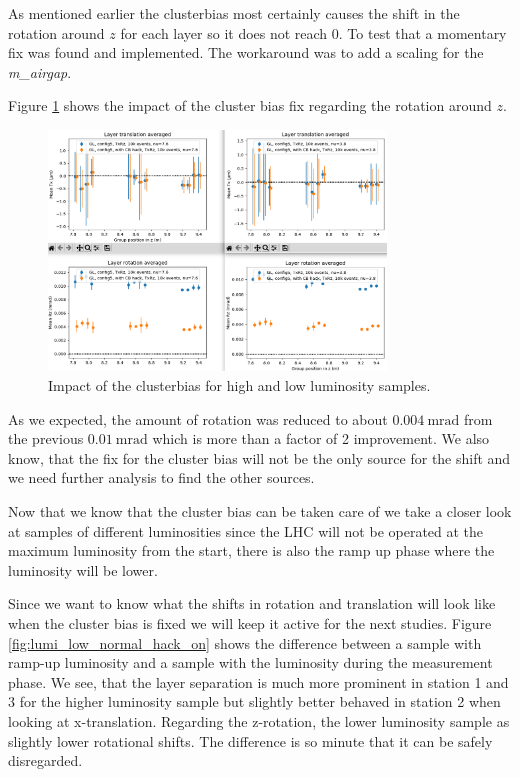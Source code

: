 As mentioned earlier the clusterbias most certainly causes the shift in the rotation around $z$ for each layer so it does not reach 0.
To test that a momentary fix was found and implemented. The workaround was to add a scaling for the \textit{m\_airgap}\cite{gap}.

Figure \ref{fig:cbhack_on_off} shows the impact of the cluster bias fix regarding
the rotation around $z$.

\begin{figure}
  \centering
  \includegraphics[width=0.8\textwidth]{plots/jan_24_2022/compare_with_without_hack.png}
  \caption{Impact of the clusterbias for high and low luminosity samples.}
  \label{fig:cbhack_on_off}
\end{figure}

As we expected, the amount of rotation was reduced to about
$\SI{0.004}{\milli\radian}$ from the previous $\SI{0.01}{\milli\radian}$ which is more than a factor of 2 improvement. We also know, that the fix for the cluster bias will not be the only source for the shift and we need further analysis to find the other sources.

Now that we know that the cluster bias can be taken care of we take a closer look at samples of different luminosities since the LHC will not be operated at the maximum luminosity from the start, there is also the ramp up phase where the luminosity will be lower.

Since we want to know what the shifts in rotation and translation will look like when the cluster bias is fixed we will keep it active for the next studies.
Figure \ref{fig:lumi_low_normal_hack_on} shows the difference between a sample with ramp-up luminosity and a sample with the luminosity during the measurement phase.
We see, that the layer separation is much more prominent in station 1 and 3 for the higher luminosity sample but slightly better behaved in station 2 when looking at x-translation.
Regarding the z-rotation, the lower luminosity sample as slightly lower rotational shifts.
The difference is so minute that it can be safely disregarded.

